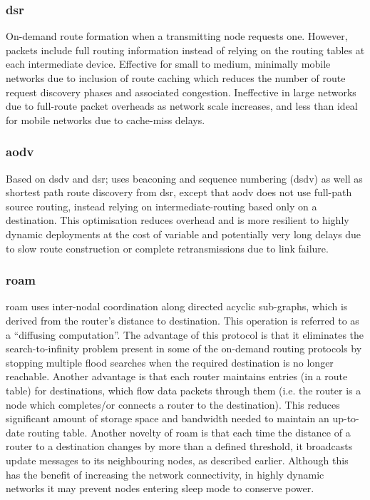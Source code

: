 \subsubsection{\gls{dsr}}
On-demand route formation when a transmitting node requests one. However, packets include full routing information instead of relying on the routing tables at each intermediate device\cite{Johnson1996}. Effective for small to medium, minimally mobile networks due to inclusion of route caching which reduces the number of route request discovery phases and associated congestion. Ineffective in large networks due to full-route packet overheads as network scale increases, and less than ideal for mobile networks due to cache-miss delays.\\
\subsubsection{\gls{aodv}}
Based on \gls{dsdv} and \gls{dsr}; uses beaconing and sequence numbering (\gls{dsdv}) as well as shortest path route discovery from \gls{dsr}, except that \gls{aodv} does not use full-path source routing, instead relying on intermediate-routing based only on a destination. This optimisation reduces overhead and is more resilient to highly dynamic deployments at the cost of variable and potentially very long delays due to slow route construction or complete retransmissions due to link failure.\cite{Rai2010a}  \\
\subsubsection{\gls{roam}}
\gls{roam} uses inter-nodal coordination along directed acyclic sub-graphs, which is derived from the router’s distance to destination. This operation is referred to as a “diffusing computation”. The advantage of this protocol is that it eliminates the search-to-infinity problem present in some of the on-demand routing protocols by stopping multiple flood searches when the required destination is no longer reachable. Another advantage is that each router maintains entries (in a route table) for destinations, which flow data packets through them (i.e. the router is a node which completes/or connects a router to the destination). This reduces significant amount of storage space and bandwidth needed to maintain an up-to-date routing table. Another novelty of \gls{roam} is that each time the distance of a router to a destination changes by more than a defined threshold, it broadcasts update messages to its neighbouring nodes, as described earlier. Although this has the benefit of increasing the network connectivity, in highly dynamic networks it may prevent nodes entering sleep mode to conserve power.\\ %

